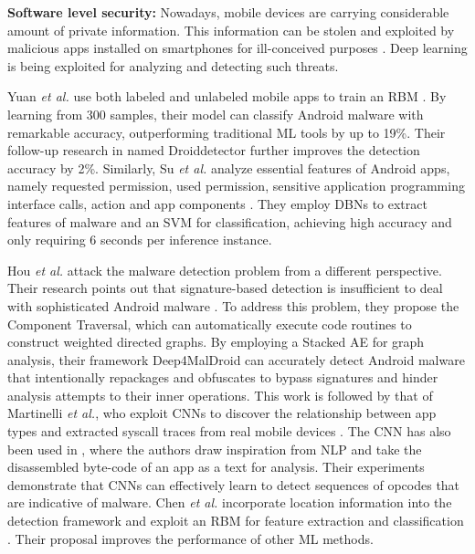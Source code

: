 \documentclass[journal,comsoc,letter]{IEEEtran}
\begin{document}
\noindent\textbf{Software level security:} Nowadays, mobile devices are carrying considerable amount of private information. This information can be stolen and exploited by malicious apps installed on smartphones for ill-conceived purposes \cite{tam2017evolution}. Deep learning is being exploited for analyzing and detecting such threats.

Yuan \emph{et al.} use both labeled and unlabeled mobile apps to train an RBM \cite{yuan2014droid}. By learning from 300 samples, their model can classify Android malware with remarkable accuracy, outperforming traditional ML tools by up to 19\%. Their follow-up research in \cite{yuan2016droiddetector} named Droiddetector further improves the detection accuracy by 2\%. Similarly, Su \emph{et al.} analyze essential features of Android apps, namely requested permission, used permission, sensitive application programming interface calls, action and app components \cite{su2016deep}. They employ DBNs to extract features of malware and an SVM for classification, achieving high accuracy and only requiring 6 seconds per inference instance.

Hou \emph{et al.} attack the malware detection problem from a different perspective. Their research points out that signature-based detection is insufficient to deal with sophisticated Android malware \cite{hou2016deep4maldroid}. To address this problem, they propose the Component Traversal, which can automatically execute code routines to construct weighted directed graphs. By employing a Stacked AE for graph analysis, their framework Deep4MalDroid can accurately detect Android malware that intentionally repackages and obfuscates to bypass signatures and hinder analysis attempts to their inner operations. This work is followed by that of Martinelli \emph{et al.}, who exploit CNNs to discover the relationship between app types and extracted syscall traces from real mobile devices \cite{martinelli2017evaluating}. The CNN has also been used in \cite{mclaughlin2017deep}, where the authors draw inspiration from NLP and take the disassembled byte-code of an app as a text for analysis. Their experiments demonstrate that CNNs can effectively learn to detect sequences of opcodes that are indicative of malware. Chen \emph{et al.} incorporate location information into the detection framework and exploit an RBM for feature extraction and classification \cite{chen2017deep123}. Their proposal improves the performance of other ML methods.
\end{document}
